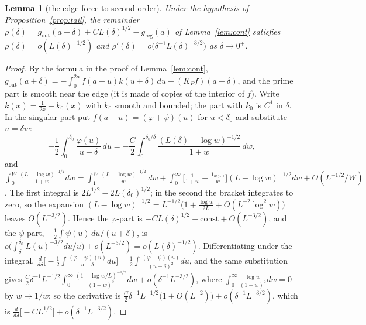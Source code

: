 \documentclass[11pt]{article}
\newtheorem{lemma}[theorem]{Lemma}
\theoremstyle{definition}
\theoremstyle{remark}
\begin{document}
\begin{lemma}[the edge force to second order]\label{lem:force}
Under the hypothesis of Proposition~\ref{prop:tail}, the remainder $\rho(\delta)=g_{\mathrm{out}}(a+\delta)+CL(\delta)^{1/2}-g_{\mathrm{reg}}(a)$ of Lemma~\ref{lem:cont} satisfies $\rho(\delta)=o(L(\delta)^{-1/2})$ and $\rho'(\delta)=o\big(\delta^{-1}L(\delta)^{-3/2}\big)$ as $\delta\to0^+$.
\end{lemma}
\begin{proof}
By the formula in the proof of Lemma~\ref{lem:cont}, $g_{\mathrm{out}}(a+\delta)=-\int_0^{2a}f(a-u)k(u+\delta)\,du+(K_Pf)(a+\delta)$, and the prime part is smooth near the edge (it is made of copies of the interior of $f$). Write $k(x)=\frac1{2x}+k_0(x)$ with $k_0$ smooth and bounded; the part with $k_0$ is $C^1$ in $\delta$. In the singular part put $f(a-u)=(\varphi+\psi)(u)$ for $u<\delta_0$ and substitute $u=\delta w$:
\[
-\frac12\int_0^{\delta_0}\frac{\varphi(u)}{u+\delta}\,du=-\frac C2\int_0^{\delta_0/\delta}\frac{(L(\delta)-\log w)^{-1/2}}{1+w}\,dw ,
\]
and $\int_0^{W}\frac{(L-\log w)^{-1/2}}{1+w}dw=\int_1^{W}\frac{(L-\log w)^{-1/2}}w\,dw+\int_0^\infty\Big[\frac1{1+w}-\frac{\mathbf 1_{w>1}}w\Big](L-\log w)^{-1/2}dw+O(L^{-1/2}/W)$. The first integral is $2L^{1/2}-2L(\delta_0)^{1/2}$; in the second the bracket integrates to zero, so the expansion $(L-\log w)^{-1/2}=L^{-1/2}\big(1+\frac{\log w}{2L}+O(L^{-2}\log^2w)\big)$ leaves $O(L^{-3/2})$. Hence the $\varphi$-part is $-CL(\delta)^{1/2}+\mathrm{const}+O(L^{-3/2})$, and the $\psi$-part, $-\frac12\int\psi(u)\,du/(u+\delta)$, is $o\big(\int_\delta^{\delta_0}L(u)^{-3/2}du/u\big)+o(L^{-3/2})=o(L(\delta)^{-1/2})$. Differentiating under the integral, $\frac d{d\delta}\Big[-\frac12\int\frac{(\varphi+\psi)(u)}{u+\delta}du\Big]=\frac12\int\frac{(\varphi+\psi)(u)}{(u+\delta)^2}du$, and the same substitution gives $\frac C2\delta^{-1}L^{-1/2}\int_0^\infty\frac{(1-\log w/L)^{-1/2}}{(1+w)^2}dw+o(\delta^{-1}L^{-3/2})$, where $\int_0^\infty\frac{\log w}{(1+w)^2}dw=0$ by $w\mapsto1/w$; so the derivative is $\frac C2\delta^{-1}L^{-1/2}\big(1+O(L^{-2})\big)+o(\delta^{-1}L^{-3/2})$, which is $\frac d{d\delta}\big[-CL^{1/2}\big]+o(\delta^{-1}L^{-3/2})$.
\end{proof}
\end{document}
